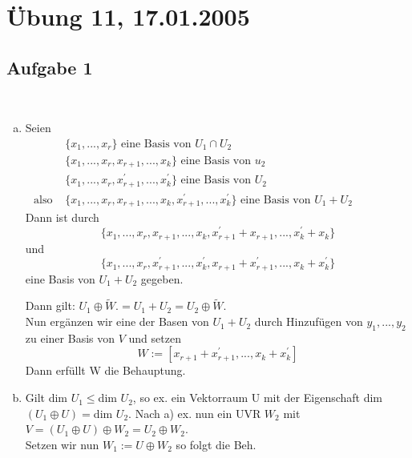 \documentclass[a4paper,twoside,DIV15,BCOR12mm]{scrbook}
\newcommand{\enua}{\ \begin{enumerate}[a)]}
\newcommand{\une}{\end{enumerate}}
\begin{document}
\section {Übung 11, 17.01.2005}
\subsection {Aufgabe 1}
\enua
\item Seien\\
$\begin{array}{ll}
 & \{x_1,...,x_r\}\text{ eine Basis von }U_1\cap U_2\\
 & \{x_1,...,x_r,x_{r+1},...,x_k\}\text{ eine Basis von }u_2\\
 & \{x_1,...,x_r,x_{r+1}^{'},...,x_k^{'}\}\text{ eine Basis von }U_2\\
\text{ also } & \{x_1,...,x_r,x_{r+1},...,x_k,x_{r+1}^{'},...,x_k^{'}\}\text{ eine Basis von }U_1+U_2
\end{array}$\\
Dann ist durch
\[\{x_1,...,x_r,x_{r+1},...,x_k, x_{r+1}^{'}+x_{r+1}, ..., x_k^{'}+x_k\}\]
und
\[\{x_1,...,x_r,x_{r+1}^{'},...,x_k^{'}, x_{r+1}+x_{r+1}^{'}, ..., x_k+x_k^{'}\}\]
eine Basis von $U_1+U_2$ gegeben.\par
Dann gilt: $U_1\oplus\tilde{W}.=U_1+U_2=U_2\oplus\tilde{W}$.\\
Nun ergänzen wir eine der Basen von $U_1+U_2$ durch Hinzufügen von $y_1,...,y_2$ zu einer Basis von $V$ und setzen
\[W:=[x_{r+1}+x_{r+1}^{'},...,x_k+x_k^{'}]\]
Dann erfüllt W die Behauptung.
\item
Gilt dim $U_1\le$dim $U_2$, so ex. ein Vektorraum U mit der Eigenschaft dim$(U_1\oplus U)=$dim $U_2$.
Nach a) ex. nun ein UVR $W_2$ mit $V=(U_1\oplus U)\oplus W_2=U_2\oplus W_2$.\\
Setzen wir nun $W_1:=U\oplus W_2$ so folgt die Beh.
\une
\end{document}
